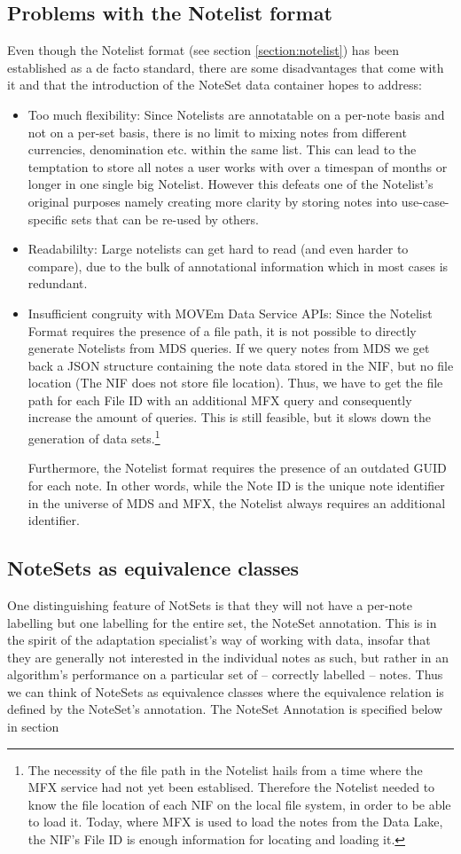 \subsection{Problems with the Notelist format}
Even though the Notelist format (see section \ref{section:notelist}) has been established as a de facto standard, there are some disadvantages that come with it and that the introduction of the NoteSet data container hopes to address:
\begin{itemize}
\item Too much flexibility: Since Notelists are annotatable on a per-note basis and not on a per-set basis, there is no limit to mixing notes from different currencies, denomination etc. within the same list. This can lead to the temptation to store all notes a user works with over a timespan of months or longer in one single big Notelist. However this defeats one of the Notelist's original purposes namely creating more clarity by storing notes into use-case-specific sets that can be re-used by others. 
\item Readabililty: Large notelists can get hard to read (and even harder to compare), due to the bulk of annotational information which in most cases is redundant. 
\item Insufficient congruity with MOVEm Data Service APIs: Since the Notelist Format requires the presence of a file path, it is not possible to directly generate Notelists from MDS queries. If we query notes from MDS we get back a JSON structure containing the note data stored in the NIF, but no file location (The NIF does not store file location). Thus, we have to get the file path for each File ID with an additional MFX query and consequently increase the amount of queries. This is still feasible, but it slows down the generation of data sets.\footnote{The necessity of the file path in the Notelist hails from a time where the MFX service had not yet been establised. Therefore the Notelist needed to know the file location of each NIF on the local file system, in order to be able to load it. Today, where MFX is used to load the notes from the Data Lake, the NIF's File ID is enough information for locating and loading it.}\par Furthermore, the Notelist format requires the presence of an outdated GUID for each note. In other words, while the Note ID is the unique note identifier in the universe of MDS and MFX, the Notelist always requires an additional identifier.
\end{itemize}
\subsection{NoteSets as equivalence classes}
One distinguishing feature of NotSets is that they will not have a per-note labelling but one labelling for the entire set, the NoteSet annotation. This is in the spirit of the adaptation specialist's way of working with data, insofar that they are generally not interested in the individual notes as such, but rather in an algorithm's performance on a particular set of -- correctly labelled -- notes. Thus we can think of NoteSets as equivalence classes where the equivalence relation is defined by the NoteSet's annotation. The NoteSet Annotation is specified below in section 
